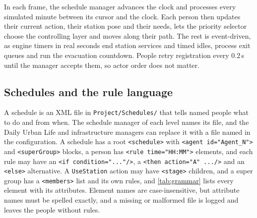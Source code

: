 In each frame, the schedule manager advances the clock and processes every simulated minute between its cursor and the clock. Each person then updates their current action, their station pose and their needs, lets the priority selector choose the controlling layer and moves along their path. The rest is event-driven, as engine timers in real seconds end station services and timed idles, process exit queues and run the evacuation countdown. People retry registration every 0.2\,s until the manager accepts them, so actor order does not matter.

\subsection{Schedules and the rule language}\label{sec:schedules}

A schedule is an XML file in \texttt{Project/Schedules/} that tells named people what to do and from when. The schedule manager of each level names its file, and the Daily Urban Life and infrastructure managers can replace it with a file named in the configuration. A schedule has a root \texttt{<schedule>} with \texttt{<agent id="Agent\_N">} and \texttt{<superGroup>} blocks, a person has \texttt{<rule time="HH:MM">} elements, and each rule may have an \texttt{<if condition="..."/>}, a \texttt{<then action="A" .../>} and an \texttt{<else>} alternative. A \texttt{UseStation} action may have \texttt{<stage>} children, and a super group has a \texttt{<members>} list and its own rules, and \cref{tab:grammar} lists every element with its attributes. Element names are case-insensitive, but attribute names must be spelled exactly, and a missing or malformed file is logged and leaves the people without rules.

